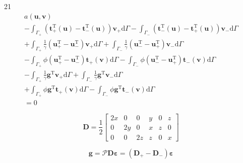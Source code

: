 \documentclass[a4paper,12pt]{article}
\begin{document}
21
\begin{equation}
\begin{split}
a(\mathbf{u},\mathbf{v})
\\-
\int_{\Gamma_+}
(\mathbf{t}_+^\textrm{T}(\mathbf{u})-\mathbf{t}_-^\textrm{T}(\mathbf{u}))\mathbf{v}_+
\textrm{d}\Gamma
-
\int_{\Gamma_-}
(\mathbf{t}_-^\textrm{T}(\mathbf{u})-\mathbf{t}_+^\textrm{T}(\mathbf{u}))\mathbf{v}_-
\textrm{d}\Gamma
\\+
\int_{\Gamma_+}
\frac{1}{\gamma}
(\mathbf{u}_+^\textrm{T} - \mathbf{u}_-^\textrm{T})
\mathbf{v}_+
\textrm{d}\Gamma
+
\int_{\Gamma_-}
\frac{1}{\gamma}
(\mathbf{u}_-^\textrm{T} - \mathbf{u}_+^\textrm{T})
\mathbf{v}_-
\textrm{d}\Gamma
\\-
\int_{\Gamma_+}
\phi
(\mathbf{u}_+^\textrm{T} - \mathbf{u}_-^\textrm{T})
\mathbf{t}_+(\mathbf{v})
\textrm{d}\Gamma
-
\int_{\Gamma_-}
\phi
(\mathbf{u}_-^\textrm{T} - \mathbf{u}_+^\textrm{T})
\mathbf{t}_-(\mathbf{v})
\textrm{d}\Gamma
\\-
\int_{\Gamma_+}
\frac{1}{\gamma}
\mathbf{g}^\textrm{T}
\mathbf{v}_+
\textrm{d}\Gamma
+
\int_{\Gamma_-}
\frac{1}{\gamma}
\mathbf{g}^\textrm{T}
\mathbf{v}_-
\textrm{d}\Gamma
\\+
\int_{\Gamma_+}
\phi\mathbf{g}^\textrm{T}
\mathbf{t}_+(\mathbf{v})
\textrm{d}\Gamma
-
\int_{\Gamma_-}
\phi\mathbf{g}^\textrm{T}
\mathbf{t}_-(\mathbf{v})
\textrm{d}\Gamma
\\=
0
\end{split}
\end{equation}

\begin{equation}
\mathbf{D}
=
\frac{1}{2}
\left[
\begin{array}{cccccc}
2x & 0 & 0 & y & 0 & z \\
0 & 2y & 0 & x & z & 0 \\
0 & 0 & 2z & z & 0 & x
\end{array}
\right]
\end{equation}

\begin{equation}
\mathbf{g}
=
\mathcal{P}\mathbf{D}{\boldsymbol\varepsilon}
=
(\mathbf{D}_{+}-\mathbf{D}_{-}){\boldsymbol\varepsilon}
\end{equation}
\end{document}
